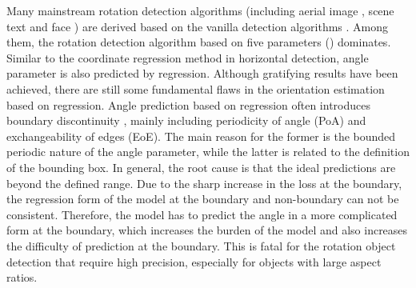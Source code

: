 \documentclass[final]{cvpr}
\begin{document}
Many mainstream rotation detection algorithms (including aerial image \cite{yang2018automatic, jiao2018densely, yang2018position, azimi2018towards, ding2018learning, yang2019scrdet, yang2019r3det, qian2019learning, yang2020arbitrary, yang2020scrdet++, yang2020on}, scene text \cite{zhou2017east, liu2018fots, jiang2017r2cnn, ma2018arbitrary, liao2018rotation, liao2018textboxes++} and face \cite{shi2018real, huang2007high, rowley1998rotation}) are derived based on the vanilla detection algorithms \cite{girshick2015fast,ren2015faster, redmon2016you,dai2016r,lin2017feature,lin2017focal}. Among them, the rotation detection algorithm based on five parameters () dominates. Similar to the coordinate regression method in horizontal detection, angle parameter is also predicted by regression. Although gratifying results have been achieved, there are still some fundamental flaws in the orientation estimation based on regression. Angle prediction based on regression often introduces boundary discontinuity \cite{yang2019scrdet, qian2019learning, yang2020arbitrary, yang2020on}, mainly including periodicity of angle (PoA) and exchangeability of edges (EoE). The main reason for the former is the bounded periodic nature of the angle parameter, while the latter is related to the definition of the bounding box. In general, the root cause is that the ideal predictions are beyond the defined range. Due to the sharp increase in the loss at the boundary, the regression form of the model at the boundary and non-boundary can not be consistent. Therefore, the model has to predict the angle in a more complicated form at the boundary, which increases the burden of the model and also increases the difficulty of prediction at the boundary. This is fatal for the rotation object detection that require high precision, especially for objects with large aspect ratios. 
\end{document}
